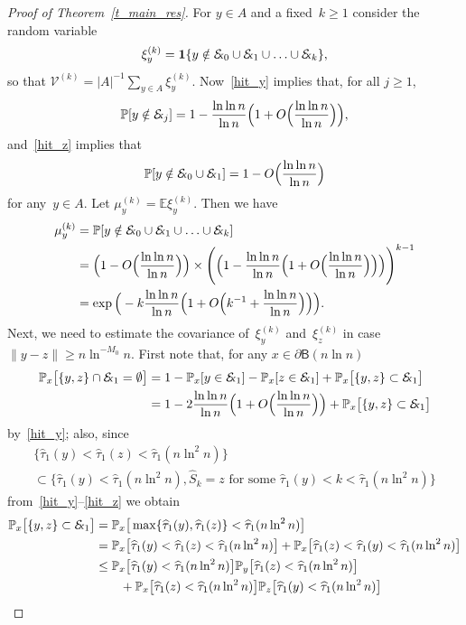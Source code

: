 \documentclass[AHL,Unicode,longabstracts]{cedram}
\newcommand{\1}[1]{{\mathbf 1}{\{#1\}}}
\newcommand{\V}{{\mathcal V}}
\newcommand{\Ex}{{\mathcal{E}\!\!\text{\footnotesize{\textsl{x}}}}}
\newcommand{\s}{{\widehat S}}
\newcommand{\8}{{\infty}}
\newcommand{\IP}{{\mathbb P}}
\newcommand{\IE}{{\mathbb E}}
\newcommand{\htau}{\widehat{\tau}}
\newcommand{\B}{{\mathsf B}}
\begin{document}
\begin{proof}[Proof of Theorem~\ref{t_main_res}]
For $y\in A$ and a fixed~$k\geq 1$ consider the random variable
\[
\xi_y^{(k)} = \1{y\notin\Ex_0\cup \Ex_1\cup \ldots \cup \Ex_k},
\]
so that $\V^{(k)} = |A|^{-1}\sum_{y\in A}\xi_y^{(k)}$. Now~\eqref{hit_y} implies that, for all $j\geq 1$,
\[
\IP[y\notin \Ex_j] = 1-\frac{\ln\ln n}{\ln n}
\Big(1+O\Big(\frac{\ln\ln n}{\ln n}\Big)\Big),
\]
and~\eqref{hit_z} implies that
\[
\IP[y\notin \Ex_0\cup\Ex_1] = 1 - O\Big(\frac{\ln\ln n}{\ln n}\Big)
\]
for any~$y\in A$. Let $\mu_y^{(k)}=\IE \xi_y^{(k)}$. Then we have
\begin{align}
\mu_y^{(k)} &= \IP[y\notin\Ex_0\cup \Ex_1\cup \ldots \cup \Ex_k]
\nonumber\\
&= \Big(1-O\Big(\frac{\ln\ln n}{\ln n}\Big)\Big)
\times
\Bigg(\Big(1-\frac{\ln\ln n}{\ln n}
\Big(1+O\Big(\frac{\ln\ln n}{\ln n}\Big)\Big)\Big)
\Bigg)^{k-1}\nonumber\\
&= \exp\Big(-k\frac{\ln\ln n}{\ln n}
\Big(1+O\Big(k^{-1}+\frac{\ln\ln n}{\ln n}\Big)\Big)\Big).\label{est_mu_k}
\end{align}
Next, we need to estimate the covariance of~$\xi_y^{(k)}$ and~$\xi_z^{(k)}$ in case $\|y-z\|\geq n\ln^{-M_0}n$. First note that, for any $x\in \partial\B(n\ln n)$
\begin{align*}
\IP_x\big[\{y,z\}\cap \Ex_1 = \emptyset \big] &= 1-\IP_x[y\in\Ex_1] - \IP_x[z\in\Ex_1] + \IP_x\big[\{y,z\}\subset \Ex_1 \big]\\
&= 1- 2 \frac{\ln\ln n}{\ln n}
\Big(1+O\Big(\frac{\ln\ln n}{\ln n}\Big)\Big) + \IP_x\big[\{y,z\}\subset \Ex_1 \big]
\end{align*}
by~\eqref{hit_y}; also, since
\begin{multline*}
\big\{\htau_1(y)<\htau_1(z)<\htau_1(n\ln^2 n)\big\} \\
\subset
\big\{\htau_1(y)<\htau_1(n\ln^2 n),\s_k=z \text{ for some }
\htau_1(y)<k<\htau_1(n\ln^2 n)\big\}
\end{multline*}
from~\eqref{hit_y}--\eqref{hit_z} we obtain
\begin{align*}
\IP_x\big[\{y,z\}\subset \Ex_1 \big] &=
\IP_x\big[\max\{\htau_1(y),\htau_1(z)\}<\htau_1(n\ln^2 n)\big]
\\
&= \IP_x\big[\htau_1(y)<\htau_1(z)<\htau_1(n\ln^2 n)\big] + \IP_x\big[\htau_1(z)<\htau_1(y)<\htau_1(n\ln^2 n)\big]\\
&\leq \IP_x\big[\htau_1(y)<\htau_1(n\ln^2 n)\big]
\IP_y\big[\htau_1(z)<\htau_1(n\ln^2 n)\big]\\
& \qquad + \IP_x\big[\htau_1(z)<\htau_1(n\ln^2 n)\big]
\IP_z\big[\htau_1(y)<\htau_1(n\ln^2 n)\big]\\

\end{align*}
\end{proof}
\end{document}

